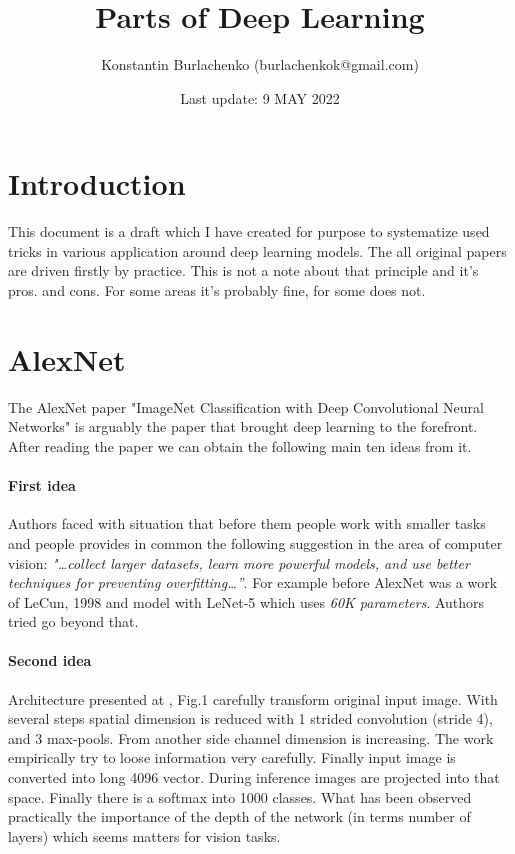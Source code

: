 \documentclass[12pt,a4paper]{article}
\title{\textbf{Parts of Deep Learning}}
\date{Last update: 9 MAY 2022}
\author{Konstantin Burlachenko (burlachenkok@gmail.com)}
\theoremstyle{plain}
\begin{document}
\maketitle
\tableofcontents
\section{Introduction}
This document is a draft which I have created for purpose to systematize used tricks in various application around deep learning models. The all original papers are driven firstly by practice. This is not a note about that principle and it's pros. and cons. For some areas it's probably fine, for some does not.

\section{AlexNet}

The AlexNet paper "ImageNet Classification with Deep Convolutional Neural Networks" \cite{krizhevsky2012imagenet} is arguably the paper that brought deep learning to the forefront. After reading the paper \cite{krizhevsky2012imagenet} we can obtain the following main ten ideas from it.

\paragraph{First idea} Authors faced with situation that before them people work with smaller tasks and people provides in common the following suggestion in the area of computer vision:  \textit{"\dots collect larger datasets, learn more powerful models, and use better techniques for preventing overfitting\dots”}. For example before AlexNet was a work of LeCun, 1998 \cite{lecun1998gradient} and model with LeNet-5 which uses \textit{60K parameters}. Authors tried go beyond that.

\paragraph{Second idea} Architecture presented at \cite{krizhevsky2012imagenet}, Fig.1 carefully transform original input image. With several steps spatial dimension is reduced with 1 strided convolution (stride 4), and 3 max-pools. From another side channel dimension is increasing. The work empirically try to loose information very carefully. Finally input image is converted into long 4096 vector. During inference images are projected into that space. Finally there is a softmax into 1000 classes. What has been observed practically the importance of the depth of the network (in terms number of layers) which seems matters for vision tasks.
\end{document}
